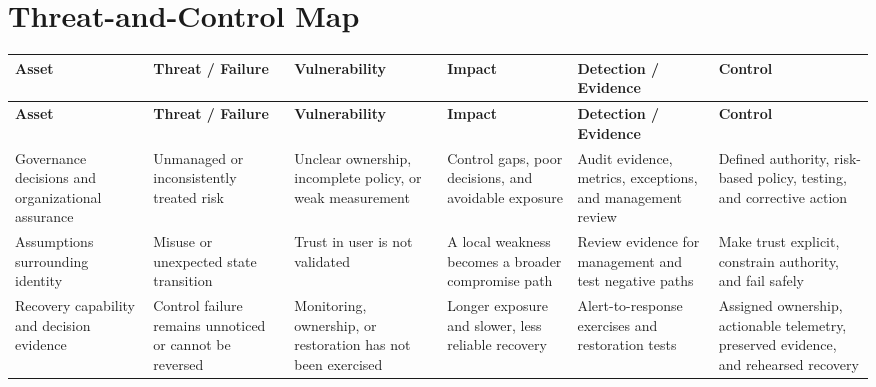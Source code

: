 \documentclass[11pt]{article}
\begin{document}
\section*{Threat-and-Control Map}
\begingroup\scriptsize\setlength{\tabcolsep}{2pt}
\begin{longtable}{>{\RaggedRight\arraybackslash}p{}>{\RaggedRight\arraybackslash}p{}>{\RaggedRight\arraybackslash}p{}>{\RaggedRight\arraybackslash}p{}>{\RaggedRight\arraybackslash}p{}>{\RaggedRight\arraybackslash}p{}}
\toprule\rowcolor{Navy}\color{white}\textbf{Asset} & \color{white}\textbf{Threat / Failure} & \color{white}\textbf{Vulnerability} & \color{white}\textbf{Impact} & \color{white}\textbf{Detection / Evidence} & \color{white}\textbf{Control}\\\midrule
\endfirsthead
\toprule\rowcolor{Navy}\color{white}\textbf{Asset} & \color{white}\textbf{Threat / Failure} & \color{white}\textbf{Vulnerability} & \color{white}\textbf{Impact} & \color{white}\textbf{Detection / Evidence} & \color{white}\textbf{Control}\\\midrule
\endhead
Governance decisions and organizational assurance & Unmanaged or inconsistently treated risk & Unclear ownership, incomplete policy, or weak measurement & Control gaps, poor decisions, and avoidable exposure & Audit evidence, metrics, exceptions, and management review & Defined authority, risk-based policy, testing, and corrective action\\\midrule
Assumptions surrounding identity & Misuse or unexpected state transition & Trust in user is not validated & A local weakness becomes a broader compromise path & Review evidence for management and test negative paths & Make trust explicit, constrain authority, and fail safely\\\midrule
Recovery capability and decision evidence & Control failure remains unnoticed or cannot be reversed & Monitoring, ownership, or restoration has not been exercised & Longer exposure and slower, less reliable recovery & Alert-to-response exercises and restoration tests & Assigned ownership, actionable telemetry, preserved evidence, and rehearsed recovery\\\midrule
\bottomrule
\end{longtable}
\endgroup
\end{document}
